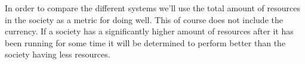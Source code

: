 \documentclass[11p]{article}
\begin{document}
In order to compare the different systems we'll use the total amount of resources in the society as a metric for doing well. This of course does not include the currency. If a society has a significantly higher amount of resources after it has been running for some time it will be determined to perform better than the society having less resources.
\end{document}
